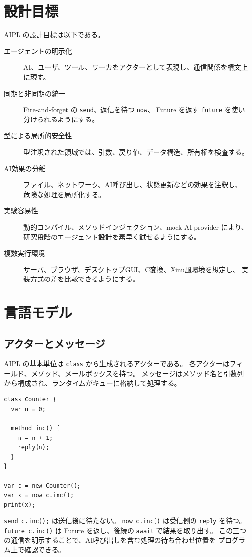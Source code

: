 \documentclass[11pt,a4paper,uplatex,dvipdfmx]{jsarticle}
\newcommand{\code}[1]{\texttt{#1}}
\begin{document}
\section{設計目標}

AIPL の設計目標は以下である。

\begin{description}
  \item[エージェントの明示化]
    AI、ユーザ、ツール、ワーカをアクターとして表現し、通信関係を構文上に現す。
  \item[同期と非同期の統一]
    Fire-and-forget の \code{send}、返信を待つ \code{now}、
    Future を返す \code{future} を使い分けられるようにする。
  \item[型による局所的安全性]
    型注釈された領域では、引数、戻り値、データ構造、所有権を検査する。
  \item[AI効果の分離]
    ファイル、ネットワーク、AI呼び出し、状態更新などの効果を注釈し、
    危険な処理を局所化する。
  \item[実験容易性]
    動的コンパイル、メソッドインジェクション、mock AI provider により、
    研究段階のエージェント設計を素早く試せるようにする。
  \item[複数実行環境]
    サーバ、ブラウザ、デスクトップGUI、C変換、Xinu風環境を想定し、
    実装方式の差を比較できるようにする。
\end{description}

\section{言語モデル}

\subsection{アクターとメッセージ}

AIPL の基本単位は \code{class} から生成されるアクターである。
各アクターはフィールド、メソッド、メールボックスを持つ。
メッセージはメソッド名と引数列から構成され、ランタイムがキューに格納して処理する。

\begin{lstlisting}
class Counter {
  var n = 0;

  method inc() {
    n = n + 1;
    reply(n);
  }
}

var c = new Counter();
var x = now c.inc();
print(x);
\end{lstlisting}

\code{send c.inc();} は送信後に待たない。
\code{now c.inc()} は受信側の \code{reply} を待つ。
\code{future c.inc()} は Future を返し、後続の \code{await} で結果を取り出す。
この三つの通信を明示することで、AI呼び出しを含む処理の待ち合わせ位置を
プログラム上で確認できる。
\end{document}

